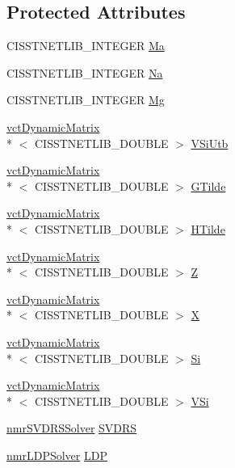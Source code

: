 \subsection*{Protected Attributes}
\begin{DoxyCompactItemize}
\item 
C\-I\-S\-S\-T\-N\-E\-T\-L\-I\-B\-\_\-\-I\-N\-T\-E\-G\-E\-R \hyperlink{classnmr_l_s_i_solver_a7c0ddb46f65e1e8504fba9b247c2b5c6}{Ma}
\item 
C\-I\-S\-S\-T\-N\-E\-T\-L\-I\-B\-\_\-\-I\-N\-T\-E\-G\-E\-R \hyperlink{classnmr_l_s_i_solver_aea6d39f413fd81118c7c6f9886263c2c}{Na}
\item 
C\-I\-S\-S\-T\-N\-E\-T\-L\-I\-B\-\_\-\-I\-N\-T\-E\-G\-E\-R \hyperlink{classnmr_l_s_i_solver_abd62da087c968c51eb33d185dab8e08f}{Mg}
\item 
\hyperlink{classvct_dynamic_matrix}{vct\-Dynamic\-Matrix}\\*
$<$ C\-I\-S\-S\-T\-N\-E\-T\-L\-I\-B\-\_\-\-D\-O\-U\-B\-L\-E $>$ \hyperlink{classnmr_l_s_i_solver_aacd1cede77ef83f0b256bdf0313c723a}{V\-Si\-Utb}
\item 
\hyperlink{classvct_dynamic_matrix}{vct\-Dynamic\-Matrix}\\*
$<$ C\-I\-S\-S\-T\-N\-E\-T\-L\-I\-B\-\_\-\-D\-O\-U\-B\-L\-E $>$ \hyperlink{classnmr_l_s_i_solver_a984e5149e5c8d0dcb08e06dab7839c27}{G\-Tilde}
\item 
\hyperlink{classvct_dynamic_matrix}{vct\-Dynamic\-Matrix}\\*
$<$ C\-I\-S\-S\-T\-N\-E\-T\-L\-I\-B\-\_\-\-D\-O\-U\-B\-L\-E $>$ \hyperlink{classnmr_l_s_i_solver_a0b156b28be901225f361dcc083070ee7}{H\-Tilde}
\item 
\hyperlink{classvct_dynamic_matrix}{vct\-Dynamic\-Matrix}\\*
$<$ C\-I\-S\-S\-T\-N\-E\-T\-L\-I\-B\-\_\-\-D\-O\-U\-B\-L\-E $>$ \hyperlink{classnmr_l_s_i_solver_a4d7c8e1a6139189dc37329bfd6743ae6}{Z}
\item 
\hyperlink{classvct_dynamic_matrix}{vct\-Dynamic\-Matrix}\\*
$<$ C\-I\-S\-S\-T\-N\-E\-T\-L\-I\-B\-\_\-\-D\-O\-U\-B\-L\-E $>$ \hyperlink{classnmr_l_s_i_solver_ac38debb9bd9fe2ab5de72a8c43195de5}{X}
\item 
\hyperlink{classvct_dynamic_matrix}{vct\-Dynamic\-Matrix}\\*
$<$ C\-I\-S\-S\-T\-N\-E\-T\-L\-I\-B\-\_\-\-D\-O\-U\-B\-L\-E $>$ \hyperlink{classnmr_l_s_i_solver_a9e3e65aec583b53f31d81317262aab44}{Si}
\item 
\hyperlink{classvct_dynamic_matrix}{vct\-Dynamic\-Matrix}\\*
$<$ C\-I\-S\-S\-T\-N\-E\-T\-L\-I\-B\-\_\-\-D\-O\-U\-B\-L\-E $>$ \hyperlink{classnmr_l_s_i_solver_aa7fbd3d91531ea1010e4abf548c02d44}{V\-Si}
\item 
\hyperlink{classnmr_s_v_d_r_s_solver}{nmr\-S\-V\-D\-R\-S\-Solver} \hyperlink{classnmr_l_s_i_solver_a7cf5b18af6140132bfdedf1ba53616d7}{S\-V\-D\-R\-S}
\item 
\hyperlink{classnmr_l_d_p_solver}{nmr\-L\-D\-P\-Solver} \hyperlink{classnmr_l_s_i_solver_afe8fa5a7652c9abcb817eaa9c28d0f6a}{L\-D\-P}
\end{DoxyCompactItemize}


